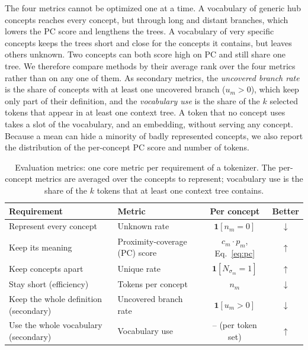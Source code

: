 The four metrics cannot be optimized one at a time.
A vocabulary of generic hub concepts reaches every concept, but through long and distant branches, which lowers the PC score and lengthens the trees.
A vocabulary of very specific concepts keeps the trees short and close for the concepts it contains, but leaves others unknown.
Two concepts can both score high on PC and still share one tree.
We therefore compare methods by their average rank over the four metrics rather than on any one of them.
As secondary metrics, the \emph{uncovered branch rate} is the share of concepts with at least one uncovered branch ($u_m > 0$), which keep only part of their definition, and the \emph{vocabulary use} is the share of the $k$ selected tokens that appear in at least one context tree.
A token that no concept uses takes a slot of the vocabulary, and an embedding, without serving any concept.
Because a mean can hide a minority of badly represented concepts, we also report the distribution of the per-concept PC score and number of tokens.
\begin{table}[t]
\centering
\small
\renewcommand{\arraystretch}{1.3}
\setlength{\tabcolsep}{4pt}
\begin{tabular}{@{}llcc@{}}
\toprule
\textbf{Requirement} & \textbf{Metric} & \textbf{Per concept} & \textbf{Better} \\
\midrule
Represent every concept & Unknown rate & $\mathbf{1}[n_m = 0]$ & $\downarrow$ \\
Keep its meaning & Proximity-coverage (PC) score & $c_m \cdot p_m$, Eq.~\eqref{eq:pc} & $\uparrow$ \\
Keep concepts apart & Unique rate & $\mathbf{1}[N_{\sigma_m} = 1]$ & $\uparrow$ \\
Stay short (efficiency) & Tokens per concept & $n_m$ & $\downarrow$ \\
\midrule
Keep the whole definition (secondary) & Uncovered branch rate & $\mathbf{1}[u_m > 0]$ & $\downarrow$ \\
Use the whole vocabulary (secondary) & Vocabulary use & -- (per token set) & $\uparrow$ \\
\bottomrule
\end{tabular}
\caption{Evaluation metrics: one core metric per requirement of a tokenizer. The per-concept metrics are averaged over the concepts to represent; vocabulary use is the share of the $k$ tokens that at least one context tree contains.}
\label{tab:metrics}
\end{table}

